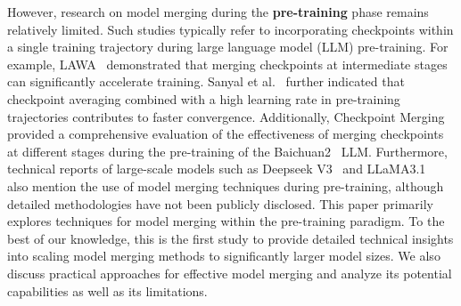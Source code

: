 However, research on model merging during the \textbf{pre-training} phase remains relatively limited. Such studies typically refer to incorporating checkpoints within a single training trajectory during large language model (LLM) pre-training.
For example, LAWA~\citep{kaddour2022stop,hagele2024scaling,li2022trainable} demonstrated that merging checkpoints at intermediate stages can significantly accelerate training. Sanyal et al.~\citep{sanyal2023early} further indicated that checkpoint averaging combined with a high learning rate in pre-training trajectories contributes to faster convergence. Additionally, Checkpoint Merging~\citep{liu2024checkpoint} provided a comprehensive evaluation of the effectiveness of merging checkpoints at different stages during the pre-training of the Baichuan2~\citep{yang2023baichuan} LLM. Furthermore, technical reports of large-scale models such as Deepseek V3~\citep{liu2024deepseek} and LLaMA3.1~\citep{grattafiori2024llama} also mention the use of model merging techniques during pre-training, although detailed methodologies have not been publicly disclosed.
This paper primarily explores techniques for model merging within the pre-training paradigm. To the best of our knowledge, this is the first study to provide detailed technical insights into scaling model merging methods to significantly larger model sizes. We also discuss practical approaches for effective model merging and analyze its potential capabilities as well as its limitations.
